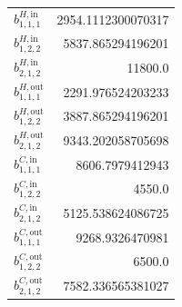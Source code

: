 \documentclass{article}%
\begin{document}
\begin{multicols*}{3}
\begin{supertabular}{lr}
	$b_{1,1,1}^{H,\text{in}}$ & 2954.1112300070317 \\%
	$b_{1,2,2}^{H,\text{in}}$ & 5837.865294196201 \\%
	$b_{2,1,2}^{H,\text{in}}$ & 11800.0 \\%
	$b_{1,1,1}^{H,\text{out}}$ & 2291.976524203233 \\%
	$b_{1,2,2}^{H,\text{out}}$ & 3887.865294196201 \\%
	$b_{2,1,2}^{H,\text{out}}$ & 9343.202058705698 \\%
	$b_{1,1,1}^{C,\text{in}}$ & 8606.7979412943 \\%
	$b_{1,2,2}^{C,\text{in}}$ & 4550.0 \\%
	$b_{2,1,2}^{C,\text{in}}$ & 5125.538624086725 \\%
	$b_{1,1,1}^{C,\text{out}}$ & 9268.9326470981 \\%
	$b_{1,2,2}^{C,\text{out}}$ & 6500.0 \\%
	$b_{2,1,2}^{C,\text{out}}$ & 7582.336565381027 \\%
\end{supertabular}%
\end{multicols*}%
\clearpage%
\end{document}
